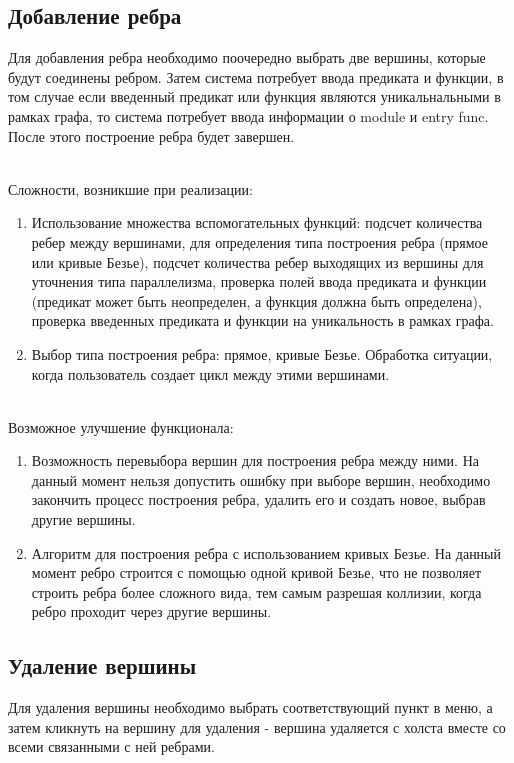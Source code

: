 \subsection{Добавление ребра}
Для добавления ребра необходимо поочередно выбрать две вершины, которые будут соединены ребром. Затем система потребует ввода предиката и функции, в том случае если введенный предикат или функция являются уникальнальными в рамках графа, то система потребует ввода информации о module и entry func. После этого построение ребра будет завершен.

~\\Сложности, возникшие при реализации:
\begin{enumerate}
	\item Использование множества вспомогательных функций: подсчет количества ребер между вершинами, для определения типа построения ребра (прямое или кривые Безье), подсчет количества ребер выходящих из вершины для уточнения типа параллелизма, проверка полей ввода предиката и функции (предикат может быть неопределен, а функция должна быть определена), проверка введенных предиката и функции на уникальность в рамках графа.
	\item Выбор типа построения ребра: прямое, кривые Безье. Обработка ситуации, когда пользователь создает цикл между этими вершинами.
\end{enumerate}

~\\Возможное улучшение функционала:
\begin{enumerate}
	\item Возможность перевыбора вершин для построения ребра между ними. На данный момент нельзя допустить ошибку при выборе вершин, необходимо закончить процесс построения ребра, удалить его и создать новое, выбрав другие вершины.
	\item Алгоритм для построения ребра с использованием кривых Безье. На данный момент ребро строится с помощью одной кривой Безье, что не позволяет строить ребра более сложного вида, тем самым разрешая коллизии, когда ребро проходит через другие вершины.
\end{enumerate}

\subsection{Удаление вершины}
Для удаления вершины необходимо выбрать соответствующий пункт в меню, а затем кликнуть на вершину для удаления - вершина удаляется с холста вместе со всеми связанными с ней ребрами.

